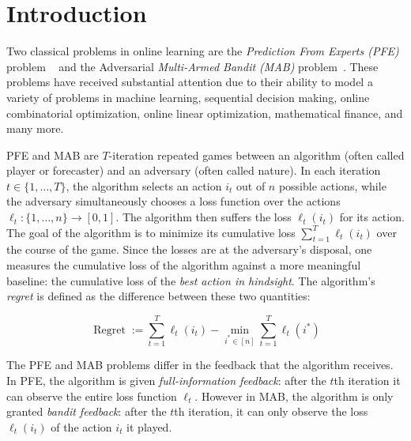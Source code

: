 \documentclass[final,12pt]{colt2018}
\DeclareMathOperator{\Regret}{\text{Regret}}
\begin{document}


\section{Introduction}\label{sec:intro}

Two classical problems in online learning are the \textit{Prediction From Experts (PFE)} problem ~\citep{CB-expert,Book-CB-Lugosi} and the Adversarial \textit{Multi-Armed Bandit (MAB)} problem~\citep{Auer02,Bubecksurvey}. These problems have received substantial attention due to their ability to model a variety of problems in machine learning, sequential decision making, online combinatorial optimization, online linear optimization,
mathematical finance, and many more.
\par PFE and MAB are $T$-iteration repeated games between an algorithm (often called player or forecaster) and an adversary (often called nature). In each iteration $t \in \{1, \dots, T\}$, the algorithm selects an action $i_t$ out of $n$ possible actions, while the adversary simultaneously chooses a loss function over the actions $\ell_t : \{1, \dots, n\} \to [0,1]$. The algorithm then suffers the loss $\ell_t(i_t)$ for its action. The goal of the algorithm is to minimize its cumulative loss $\sum_{t=1}^T \ell_t(i_t)$ over the course of the game. Since the losses are at the adversary's disposal, one measures the cumulative loss of the algorithm against a more meaningful baseline: the cumulative loss of the \textit{best action in hindsight}. The algorithm's \textit{regret} is defined as the difference between these two quantities:

\[
\Regret := \sum_{t=1}^T \ell_t(i_t) - \min_{i^* \in [n]} \sum_{t=1}^T \ell_t(i^*)
\]
\par The PFE and MAB problems differ in the feedback that the algorithm receives. In PFE, the algorithm is given \textit{full-information feedback}: after the $t$th iteration it can observe the entire loss function $\ell_t$. However in MAB, the algorithm is only granted \textit{bandit feedback}: after the $t$th iteration, it can only observe the loss $\ell_t(i_t)$ of the action $i_t$ it played.
\end{document}
